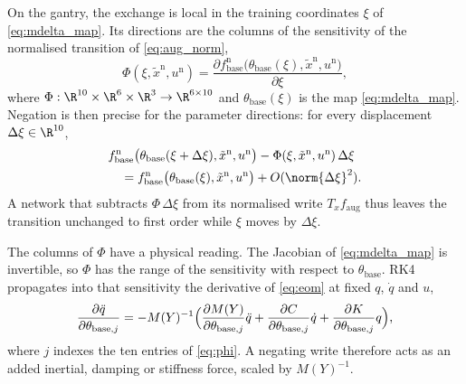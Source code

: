 On the gantry, the exchange is local in the training coordinates $\xi$ of
\eqref{eq:mdelta_map}.
Its directions are the columns of the sensitivity of the normalised transition
of \eqref{eq:aug_norm},
\begin{equation}
 \Phi(\xi,\tilde x^{\mathrm n},u^{\mathrm n})
 =\frac{\partial f^{\mathrm n}_{\mathrm{base}}
   \bigl(\theta_{\mathrm{base}}(\xi),\tilde x^{\mathrm n},u^{\mathrm n}\bigr)}
   {\partial\xi},
 \label{eq:obc_sens}
\end{equation}
where $\Phi:\R^{10}\times\R^6\times\R^3\to\R^{6\times10}$ and
$\theta_{\mathrm{base}}(\xi)$ is the map \eqref{eq:mdelta_map}.
Negation is then precise for the parameter directions: for every
displacement $\Delta\xi\in\R^{10}$,
\begin{equation}
\begin{aligned}
 &f^{\mathrm n}_{\mathrm{base}}\bigl(\theta_{\mathrm{base}}(\xi+\Delta\xi),\tilde x^{\mathrm n},u^{\mathrm n}\bigr)
 -\Phi(\xi,\tilde x^{\mathrm n},u^{\mathrm n})\,\Delta\xi\\
 &\quad=f^{\mathrm n}_{\mathrm{base}}\bigl(\theta_{\mathrm{base}}(\xi),\tilde x^{\mathrm n},u^{\mathrm n}\bigr)
 +O(\norm{\Delta\xi}^2).
\end{aligned}
\label{eq:obc_negation}
\end{equation}
A network that subtracts $\Phi\,\Delta\xi$ from its normalised write
$T_xf_{\mathrm{aug}}$ thus leaves the transition unchanged to first order
while $\xi$ moves by $\Delta\xi$.

The columns of $\Phi$ have a physical reading.
The Jacobian of \eqref{eq:mdelta_map} is invertible, so $\Phi$ has the range
of the sensitivity with respect to $\theta_{\mathrm{base}}$.
RK4 propagates into that sensitivity the derivative of \eqref{eq:eom} at fixed
$q$, $\dot q$ and $u$,
\begin{equation}
 \frac{\partial\ddot q}{\partial\theta_{\mathrm{base},j}}
 =-M(Y)^{-1}\Bigl(\frac{\partial M(Y)}{\partial\theta_{\mathrm{base},j}}\ddot q
 +\frac{\partial C}{\partial\theta_{\mathrm{base},j}}\dot q
 +\frac{\partial K}{\partial\theta_{\mathrm{base},j}}q\Bigr),
 \label{eq:obc_gantry_sens}
\end{equation}
where $j$ indexes the ten entries of \eqref{eq:phi}.
A negating write therefore acts as an added inertial, damping or stiffness
force, scaled by $M(Y)^{-1}$.

